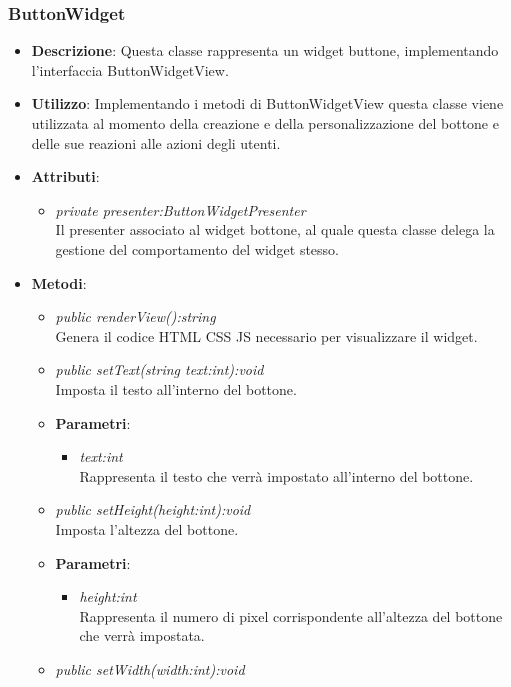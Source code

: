 \subsubsection{ButtonWidget}
\begin{itemize}
\item \textbf{Descrizione}: Questa classe rappresenta un widget buttone, implementando l'interfaccia ButtonWidgetView.
\item \textbf{Utilizzo}: Implementando i metodi di ButtonWidgetView questa classe viene utilizzata al momento della creazione e della personalizzazione del bottone e delle sue reazioni alle azioni degli utenti.
\item \textbf{Attributi}: 
	\begin{itemize}
	\item \textit{private presenter:ButtonWidgetPresenter}\\
	Il presenter associato al widget bottone, al quale questa classe delega la gestione del comportamento del widget stesso.
	\end{itemize}
\item \textbf{Metodi}:
	\begin{itemize}
	\item \textit{public renderView():string}\\
	 Genera il codice HTML CSS JS necessario per visualizzare il widget.
	\item \textit{public setText(string text:int):void}\\
	Imposta il testo all'interno del bottone.
		\item{\textbf{Parametri}: \begin{itemize}
		\item \textit{text:int}\\
		Rappresenta il testo che verrà impostato all'interno del bottone.
		\end{itemize}}
	\item \textit{public setHeight(height:int):void}\\
	Imposta l'altezza del bottone.
		\item{\textbf{Parametri}: \begin{itemize}
		\item \textit{height:int}\\
		Rappresenta il numero di pixel corrispondente all'altezza del bottone che verrà impostata.
		\end{itemize}}
	\item \textit{public setWidth(width:int):void}\\

\end{itemize}
\end{itemize}

